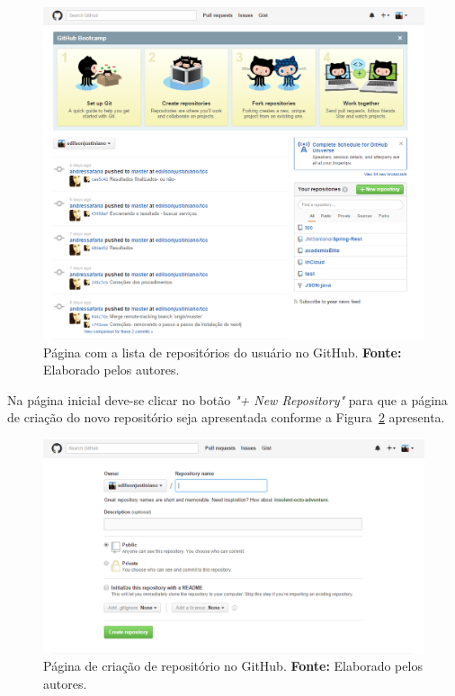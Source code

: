 \newpage
\captionsetup[figure]{list=no}
\begin{figure}[h!]
	\centerline{\includegraphics[scale=0.5]{./imagens/apendices/pagina-home-github.png}}
	\caption[Página com a lista de repositórios do usuário no GitHub.]
	{Página com a lista de repositórios do usuário no GitHub. \textbf{Fonte:} Elaborado pelos autores.}
	\label{fig:ap1:pagina_home_github}
\end{figure}


Na página inicial deve-se clicar no botão \textit{"+ New Repository"} para que a página de criação do novo repositório seja apresentada conforme a Figura~\ref{fig:ap1:pagina_criacao_repository_github} apresenta.
\newpage
\captionsetup[figure]{list=no}
\begin{figure}[h!]
	\centerline{\includegraphics[scale=0.5]{./imagens/apendices/pagina-criacao-repositorio-github.png}}
	\caption[Página de criação de repositório no GitHub.]
	{Página de criação de repositório no GitHub. \textbf{Fonte:} Elaborado pelos autores.}
	\label{fig:ap1:pagina_criacao_repository_github}
\end{figure}

